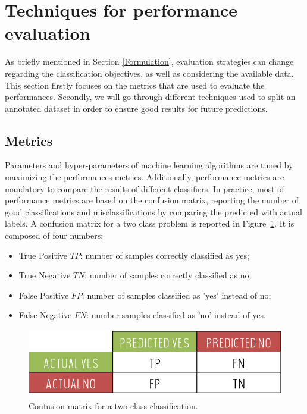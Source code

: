 \documentclass[a4paper,10pt]{article}
\begin{document}
\section{Techniques for performance evaluation}
\label{Evaluation}

As briefly mentioned in Section \ref{Formulation}, evaluation strategies can change regarding the classification objectives, as well as considering the available data. This section firstly focuses on the metrics that are used to evaluate the performances. Secondly, we will go through different techniques used to split an annotated dataset in order to ensure good results for future predictions.

\subsection{Metrics}
\label{metrics}

Parameters and hyper-parameters of machine learning algorithms are tuned by maximizing the performances metrics. Additionally, performance metrics are mandatory to compare the results of different classifiers. In practice, most of performance metrics are based on the confusion matrix, reporting the number of good classifications and misclassifications by comparing the predicted with actual labels. A confusion matrix for a two class problem is reported in Figure~\ref{MC}. It is composed of four numbers:
\begin{itemize}
\item True Positive $TP$: number of samples correctly classified as yes;
\item True Negative $TN$: number of samples correctly classified as no;
\item False Positive $FP$: number of samples classified as 'yes' instead of no;
\item False Negative $FN$: number samples classified as 'no' instead of yes.
\end{itemize}

\begin{figure}[htbp]
\centerline{\includegraphics[width=0.5\linewidth]{./figures/ConfusionMatrix.png}}
\caption{Confusion matrix for a two class classification.}
\label{MC}
\end{figure}
\end{document}
